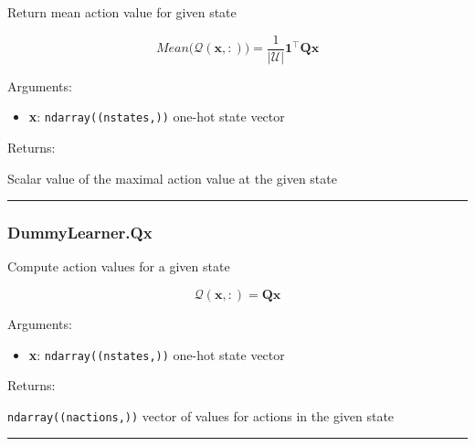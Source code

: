 \begin{Shaded}
\begin{Highlighting}[]
\end{Highlighting}
\end{Shaded}

Return mean action value for given state

\[
Mean \big(\mathcal Q(\mathbf x, :)\big) = \frac{1}{|\mathcal U|} \mathbf 1^\top \mathbf Q \mathbf x
\]

Arguments:

\begin{itemize}
\tightlist
\item
  \textbf{x}: \texttt{ndarray((nstates,))} one-hot state vector
\end{itemize}

Returns:

Scalar value of the maximal action value at the given state

\begin{center}\rule{0.5\linewidth}{\linethickness}\end{center}

\hypertarget{dummylearner.qx}{%
\subsubsection{DummyLearner.Qx}\label{dummylearner.qx}}

\begin{Shaded}
\begin{Highlighting}[]
\end{Highlighting}
\end{Shaded}

Compute action values for a given state

\[
\mathcal Q(\mathbf x, :) = \mathbf Q \mathbf x
\]

Arguments:

\begin{itemize}
\tightlist
\item
  \textbf{x}: \texttt{ndarray((nstates,))} one-hot state vector
\end{itemize}

Returns:

\texttt{ndarray((nactions,))} vector of values for actions in the given
state

\begin{center}\rule{0.5\linewidth}{\linethickness}\end{center}

